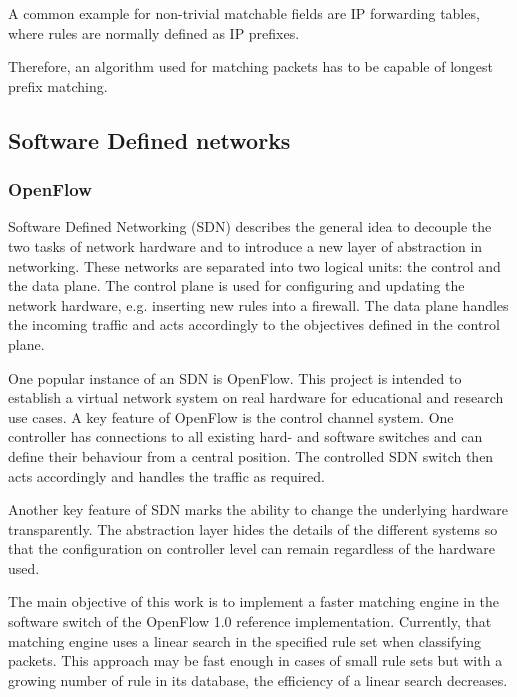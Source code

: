 \documentclass[a4paper,
		12pt,
		parskip=full,
		titlepage
		]{scrartcl}
\begin{document}
A common example for non-trivial matchable fields are IP forwarding tables, where rules are normally defined as IP prefixes.


Therefore, an algorithm used for matching packets has to be capable of longest prefix matching.


\subsection{Software Defined networks}
\label{sec:SDN}
\subsubsection{OpenFlow}
Software Defined Networking (SDN) describes the general idea to decouple the two tasks of network hardware and to introduce a new layer of abstraction in networking. %
These networks are separated into two logical units: the control and the data plane.
The control plane is used for configuring and updating the network hardware, e.g. inserting new rules into a firewall.
The data plane handles the incoming traffic and acts accordingly to the objectives defined in the control plane.

One popular instance of an SDN is OpenFlow.
This project is intended to establish a virtual network system on real hardware for educational and research use cases.
A key feature of OpenFlow is the control channel system.
One controller has connections to all existing hard- and software switches and can define their behaviour from a central position.
The controlled SDN switch then acts accordingly and handles the traffic as required.

Another key feature of SDN marks the ability to change the underlying hardware transparently.
The abstraction layer hides the details of the different systems so that the configuration on controller level can remain regardless of the hardware used.

The main objective of this work is to implement a faster matching engine in the software switch of the OpenFlow 1.0 reference implementation.
Currently, that matching engine uses a linear search in the specified rule set when classifying packets.
This approach may be fast enough in cases of small rule sets but with a growing number of rule in its database, the efficiency of a linear search decreases.
\end{document}
